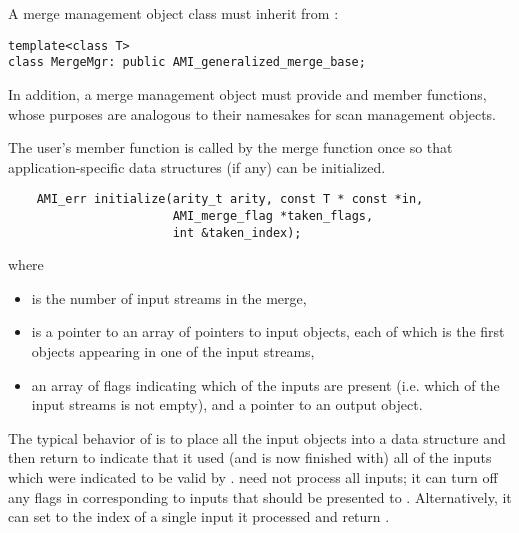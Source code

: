 A merge management object class must inherit from
:
\begin{verbatim}
template<class T>
class MergeMgr: public AMI_generalized_merge_base;
\end{verbatim}
In addition, 
a merge management object must provide 
and  member functions, whose purposes are
analogous to their namesakes for scan management objects.

    The user's  member function is
    called by the merge function once so that
    application-specific data structures (if any) can be
    initialized.
\begin{verbatim}
    AMI_err initialize(arity_t arity, const T * const *in,
                       AMI_merge_flag *taken_flags,
                       int &taken_index);
\end{verbatim}
 
    where
    \begin{itemize}
        \item {} is the number of input streams
        in the merge,
        \item {} is a pointer to an array of
        pointers to input objects, each of which is the
        first objects appearing in one of the input streams,    
        \item {} an array of flags
        indicating which of the inputs are present (i.e.
        which of the input streams is not empty), and a
        pointer to an output object.
    \end{itemize}
    
    The typical behavior of  is to
    place all the input objects into a data structure and
    then return  to
    indicate that it used (and is now finished with) all of
    the inputs which were indicated to be valid by
    .   need not
    process all inputs; it can turn off any flags in
     corresponding to inputs that
    should be presented to .
    Alternatively, it can set  to the
    index of a single input it processed and return
    .

